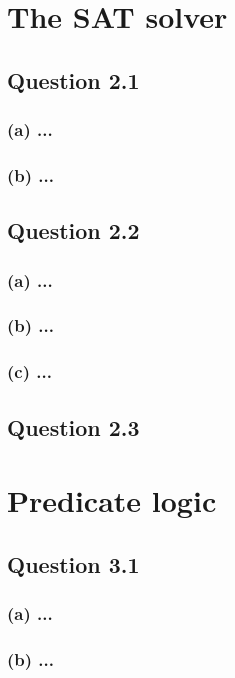 \documentclass[10pt,a4paper]{article}
\begin{document}
\section{The SAT solver}
\subsection*{Question 2.1}
\subsubsection*{(a) \mdseries ...}
\subsubsection*{(b) \mdseries ...}

\subsection*{Question 2.2}
\subsubsection*{(a) \mdseries ...}
\subsubsection*{(b) \mdseries ...}
\subsubsection*{(c) \mdseries ...}

\subsection*{Question 2.3}

\section{Predicate logic}
\subsection*{Question 3.1}
\subsubsection*{(a) \mdseries ...}
\subsubsection*{(b) \mdseries ...}
\end{document}

